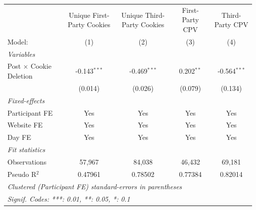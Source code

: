 \begin{tabular}{lcccc}
   \tabularnewline \midrule \midrule
                                  & Unique First-Party Cookies & Unique Third-Party Cookies & First-Party CPV & Third-Party CPV \\   
   Model:                         & (1)                        & (2)                        & (3)             & (4)\\  
   \midrule
   \emph{Variables}\\
   Post $\times$ Cookie Deletion  & -0.143$^{***}$             & -0.469$^{***}$             & 0.202$^{**}$    & -0.564$^{***}$\\   
                                  & (0.014)                    & (0.026)                    & (0.079)         & (0.134)\\   
   \midrule
   \emph{Fixed-effects}\\
   Participant FE                 & Yes                        & Yes                        & Yes             & Yes\\  
   Website FE                     & Yes                        & Yes                        & Yes             & Yes\\  
   Day FE                         & Yes                        & Yes                        & Yes             & Yes\\  
   \midrule
   \emph{Fit statistics}\\
   Observations                   & 57,967                     & 84,038                     & 46,432          & 69,181\\  
   Pseudo R$^2$                   & 0.47961                    & 0.78502                    & 0.77384         & 0.82014\\  
   \midrule \midrule
   \multicolumn{5}{l}{\emph{Clustered (Participant FE) standard-errors in parentheses}}\\
   \multicolumn{5}{l}{\emph{Signif. Codes: ***: 0.01, **: 0.05, *: 0.1}}\\
\end{tabular}
